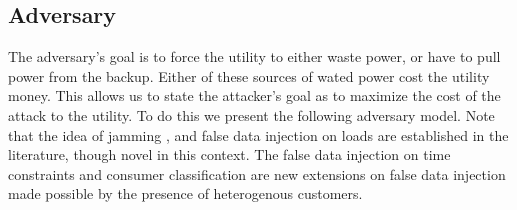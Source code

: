 \documentclass[conference]{IEEEtran}
\begin{document}
\subsection{Adversary}
\label{Adversary}

The adversary's goal is to force the utility to either waste power, or have to pull power from the backup. Either of these sources of wated power cost the utility money. This allows us to state the attacker's goal as to maximize the cost of the attack to the utility. To do this we present the following adversary model. Note that the idea of jamming \cite{gupta2010optimal}, and false data injection on loads \cite{lin2012false}\cite{yuan2011modeling} are established in the literature, though novel in this context. The false data injection on time constraints and consumer classification are new extensions on false data injection made possible by the presence of heterogenous customers.
\end{document}
